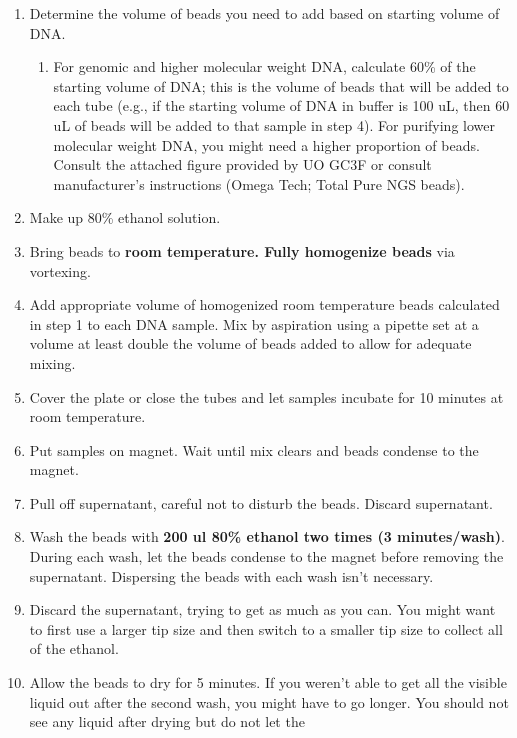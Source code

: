 \documentclass[
  letterpaper,
  DIV=11,
  numbers=noendperiod]{scrreprt}
\providecommand{\tightlist}{%
  \setlength{\itemsep}{0pt}\setlength{\parskip}{0pt}}\usepackage{longtable,booktabs,array}
\begin{document}
\begin{enumerate}
\def\labelenumi{\arabic{enumi}.}
\tightlist
\item
  Determine the volume of beads you need to add based on starting volume
  of DNA.

  \begin{enumerate}
  \def\labelenumii{\alph{enumii}.}
  \tightlist
  \item
    For genomic and higher molecular weight DNA, calculate 60\% of the
    starting volume of DNA; this is the volume of beads that will be
    added to each tube (e.g., if the starting volume of DNA in buffer is
    100 uL, then 60 uL of beads will be added to that sample in step 4).
    For purifying lower molecular weight DNA, you might need a higher
    proportion of beads. Consult the attached figure provided by UO GC3F
    or consult manufacturer's instructions (Omega Tech; Total Pure NGS
    beads).
  \end{enumerate}
\item
  Make up 80\% ethanol solution.
\item
  Bring beads to \textbf{room temperature. Fully homogenize beads} via
  vortexing.
\item
  Add appropriate volume of homogenized room temperature beads
  calculated in step 1 to each DNA sample. Mix by aspiration using a
  pipette set at a volume at least double the volume of beads added to
  allow for adequate mixing.
\item
  Cover the plate or close the tubes and let samples incubate for 10
  minutes at room temperature.
\item
  Put samples on magnet. Wait until mix clears and beads condense to the
  magnet.
\item
  Pull off supernatant, careful not to disturb the beads. Discard
  supernatant.
\item
  Wash the beads with \textbf{200 ul 80\% ethanol two times (3
  minutes/wash)}. During each wash, let the beads condense to the magnet
  before removing the supernatant. Dispersing the beads with each wash
  isn't necessary.
\item
  Discard the supernatant, trying to get as much as you can. You might
  want to first use a larger tip size and then switch to a smaller tip
  size to collect all of the ethanol.
\item
  Allow the beads to dry for 5 minutes. If you weren't able to get all
  the visible liquid out after the second wash, you might have to go
  longer. You should not see any liquid after drying but do not let the

\end{enumerate}
\end{document}
